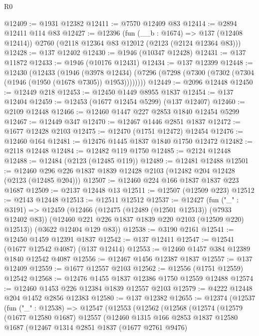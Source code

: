 \begin{lexlean}{R0}
\begin{coremodule}
@12409 := @1931 @12382
@12411 := @7570 @12409 @83
@12414 := @2894 @12411 @114 @83
@12427 := @12396
    (fun (__b : @1674) => @137 (@12408 @12414))
    @2760
    (@2118 @12364 @83 @12012 (@2123 (@2124 @12364 @83)))
@12428 := @137 @12402
@12430 := @1946 (@10347 @12428)
@12431 := @137 @11872
@12433 := @1946 (@10176 @12431)
@12434 := @137 @12399
@12448 := @12430
    (@12433
      (@1946
        (@3978 @12434)
        (@7296 (@7298 (@7300 (@7302 (@7304 (@1946 (@1950 (@1678 @7305)) @1953))))))))
@12449 := @2096 @12448
@12450 := @12449 @218
@12453 := @12450 @1449 @8955 @1837
@12454 := @137 @12404
@12459 := @12453 (@1677 @12454 @5299) (@137 @12407)
@12460 := @2109 @12448
@12466 := @12460 @1447 @227 @2853 @1840 @12454 @5299
@12467 := @12449 @347
@12470 := @12467 @1446 @2851 @1837
@12472 := @1677 @12428 @2103
@12475 := @12470 (@1751 @12472) @12454
@12476 := @12460 @164
@12481 := @12476 @1445 @1837 @1840 @1750 @12472
@12482 := @2118 @12448
@12484 := @12482 @119 @1750
@12485 := @2124 @12448
@12488 := @12484 (@2123 (@12485 @119))
@12489 := @12481 @12488
@12501 := @12460 @296 @226 @1837 @1839 @12428 @2103 (@12482 @204 @12428 (@2123 (@12485 @204)))
@12507 := @12460 @224 @166 @1837 @1837 @223 @1687
@12509 := @2137 @12448 @13
@12511 := @12507 (@12509 @223)
@12512 := @2143 @12448
@12513 := @12511 @12512
@12537 := @12427
    (fun ("_" : @3191) =>
    @12459
      (@12466
        (@12475 (@12489 (@12501 @12513)) (@7933 @12402 @83))
        (@12460 @221 @226 @1837 @1839 @220 @2103 (@12509 @220) @12513))
      (@3622 @12404 @129 @83))
@12538 := @3190 @2161
@12541 := @12450 @1459 @12391 @1837
@12542 := @137 @12411
@12547 := @12541 (@1677 @12542 @4087) (@137 @12414)
@12553 := @12460 @1457 @384 @12389 @1840 @12542 @4087
@12556 := @12467 @1456 @12387 @1837
@12557 := @137 @12409
@12559 := @1677 @12557 @2103
@12562 := @12556 (@1751 @12559) @12542
@12568 := @12476 @1455 @1837 @12386 @1750 @12559 @12488
@12574 := @12460 @1453 @226 @12384 @1839 @12557 @2103
@12579 := @4222 @12448 @204 @1452 @2856 @12383
@12580 := @137 @12382
@12655 := @12374
    (@12537
      (fun ("_" : @12538) =>
      @12547
        (@12553
          (@12562
            (@12568
              (@12574
                (@12579
                  (@1677 @12580 @1687)
                  @12557
                  (@12460
                    @1315
                    @166
                    @2853
                    @1837
                    @12580
                    @1687
                    (@12467
                      @1314
                      @2851
                      @1837
                      (@1677 @2761 @9476)

\end{coremodule}
\end{lexlean}
